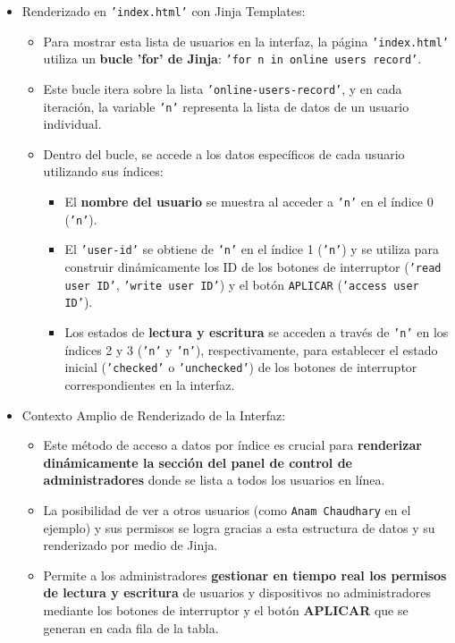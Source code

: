 \documentclass{report}
\begin{document}
\begin{itemize}
    \item Renderizado en \texttt{'index.html'} con Jinja Templates:
    \begin{itemize}
        \item Para mostrar esta lista de usuarios en la interfaz, la página \texttt{'index.html'} utiliza un \textbf{bucle 'for' de Jinja}: 
        \texttt{'for n in online users record'}.
        \item Este bucle itera sobre la lista \texttt{'online-users-record'}, y en cada iteración, la variable \texttt{'n'} representa la lista de 
        datos de un usuario individual.
        \item Dentro del bucle, se accede a los datos específicos de cada usuario utilizando sus índices:
        \begin{itemize}
            \item El \textbf{nombre del usuario} se muestra al acceder a \texttt{'n'} en el índice 0 (\texttt{'n'}).
            \item El \texttt{'user-id'} se obtiene de \texttt{'n'} en el índice 1 (\texttt{'n'}) y se utiliza para construir dinámicamente los ID de 
            los botones de interruptor (\texttt{'read user ID'}, \texttt{'write user ID'}) y el botón \texttt{APLICAR} (\texttt{'access user ID'}).
            \item Los estados de \textbf{lectura y escritura} se acceden a través de \texttt{'n'} en los índices 2 y 3 (\texttt{'n'} y \texttt{'n'}), 
            respectivamente, para establecer el estado inicial (\texttt{'checked'} o \texttt{'unchecked'}) de los botones de interruptor correspondientes 
            en la interfaz.
        \end{itemize}
    \end{itemize}

    \item Contexto Amplio de Renderizado de la Interfaz:
    \begin{itemize}
        \item Este método de acceso a datos por índice es crucial para \textbf{renderizar dinámicamente la sección del panel de control de administradores} 
        donde se lista a todos los usuarios en línea.
        \item La posibilidad de ver a otros usuarios (como \texttt{Anam Chaudhary} en el ejemplo) y sus permisos se logra gracias a esta estructura de 
        datos y su renderizado por medio de Jinja.
        \item Permite a los administradores \textbf{gestionar en tiempo real los permisos de lectura y escritura} de usuarios y dispositivos no 
        administradores mediante los botones de interruptor y el botón \textbf{APLICAR} que se generan en cada fila de la tabla.    
    \end{itemize}
\end{itemize}
\end{document}
